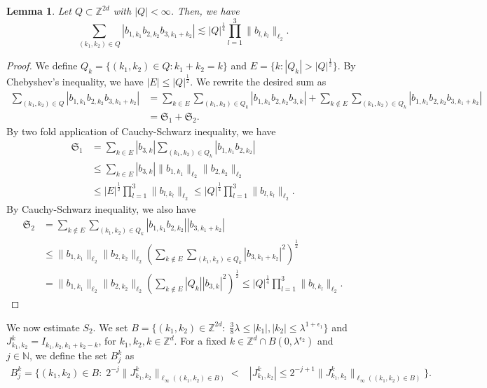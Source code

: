 \documentclass[a4paper,reqno]{amsart}
\newcommand{\N}{{\mathbb N}}
\newcommand{\Z}{{\mathbb Z}}
\newtheorem{lemma}[theorem]{Lemma}
\theoremstyle{definition}
\numberwithin{equation}{section}
\begin{document}
\begin{lemma}\label{lemma:counting}
	Let $Q\subset\Z^{2d}$ with $|Q|<\infty$. Then, we have
	\[\sum_{(k_1,k_2)\in Q}\left|b_{1,k_1}b_{2,k_2}b_{3,k_1+k_2}\right|\lesssim |Q|^\frac{1}{4}\prod_{l=1}^3\|b_{l,k_l}\|_{\ell_2}. \]
\end{lemma}
\begin{proof}
	We define $Q_k=\{(k_1,k_2)\in Q:k_1+k_2=k\}$ and $E=\{k:|Q_k|>|Q|^\frac{1}{2}\}$. By Chebyshev's inequality, we have $|E|\leq |Q|^\frac{1}{2}$. We rewrite the desired sum as
	\begin{align*}
		\sum_{(k_1,k_2)\in Q}\left|b_{1,k_1}b_{2,k_2}b_{3,k_1+k_2}\right|&=\sum_{k\in E}\sum_{(k_1,k_2)\in Q_k}\left|b_{1,k_1}b_{2,k_2}b_{3,k}\right|+\sum_{k\notin E}\sum_{(k_1,k_2)\in Q_k}\left|b_{1,k_1}b_{2,k_2}b_{3,k_1+k_2}\right|\\
		&=\mathfrak{S}_1+\mathfrak{S}_2.
	\end{align*}
	By two fold application of Cauchy-Schwarz inequality, we have
	\begin{align*}
		\mathfrak{S}_1&=\sum_{k\in E}|b_{3,k}|\sum_{(k_1,k_2)\in Q_k}|b_{1,k_1}b_{2,k_2}|\\
		&\leq\sum_{k\in E}|b_{3,k}|\|b_{1,k_1}\|_{\ell_2}\|b_{2,k_2}\|_{\ell_2}\\
		&\leq|E|^\frac{1}{2}\prod_{l=1}^3\|b_{l,k_l}\|_{\ell_2}\leq|Q|^\frac{1}{4}\prod_{l=1}^3\|b_{l,k_l}\|_{\ell_2}.
	\end{align*}
	By Cauchy-Schwarz inequality, we also have
	\begin{align*}
		\mathfrak{S}_2&=\sum_{k\notin E}\sum_{(k_1,k_2)\in Q_k}|b_{1,k_1}b_{2,k_2}||b_{3,k_1+k_2}|\\
		&\leq\|b_{1,k_1}\|_{\ell_2}\|b_{2,k_2}\|_{\ell_2}\left(\sum_{k\notin E}\sum_{(k_1,k_2)\in Q_k}|b_{3,k_1+k_2}|^2\right)^\frac{1}{2}\\
		&=\|b_{1,k_1}\|_{\ell_2}\|b_{2,k_2}\|_{\ell_2}\left(\sum_{k\notin E}|Q_k||b_{3,k}|^2\right)^\frac{1}{2}\leq|Q|^\frac{1}{4}\prod_{l=1}^3\|b_{l,k_l}\|_{\ell_2}.
	\end{align*}
\end{proof}
We now estimate $S_2$. We set $B=\{(k_1,k_2)\in\Z^{2d}:\;\frac{3}{8}\lambda\leq|k_1|,|k_2|\leq\lambda^{1+\epsilon_1}\}$ and $J_{k_1,k_2}^k=I_{k_1,k_2,k_1+k_2-k}$, for $k_1,k_2,k\in\Z^d$. For a fixed $k\in\Z^d\cap B(0,\lambda^{\epsilon_2})$ and $j\in\N$, we define the set $B_j^k$ as
\begin{align*}
	B_j^k=\{(k_1,k_2)\in B:\;2^{-j}\|J_{k_1,k_2}^k\|_{\ell_\infty((k_1,k_2)\in B)}<&|J_{k_1,k_2}^k|\leq2^{-j+1}\|J_{k_1,k_2}^k\|_{\ell_\infty((k_1,k_2)\in B)}\}.
\end{align*}
\end{document}
